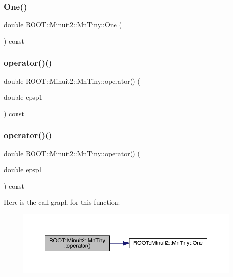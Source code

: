 \subsubsection{\texorpdfstring{One()}{One()}\hspace{0.1cm}{\footnotesize\ttfamily [2/2]}}
{\footnotesize\ttfamily double R\+O\+O\+T\+::\+Minuit2\+::\+Mn\+Tiny\+::\+One (\begin{DoxyParamCaption}{ }\end{DoxyParamCaption}) const}

\mbox{\label{classROOT_1_1Minuit2_1_1MnTiny_ae266eaf0c58687bf37419ca463c51bf7}} 
\subsubsection{\texorpdfstring{operator()()}{operator()()}\hspace{0.1cm}{\footnotesize\ttfamily [1/2]}}
{\footnotesize\ttfamily double R\+O\+O\+T\+::\+Minuit2\+::\+Mn\+Tiny\+::operator() (\begin{DoxyParamCaption}\item[{double}]{epsp1 }\end{DoxyParamCaption}) const}

\mbox{\label{classROOT_1_1Minuit2_1_1MnTiny_ae266eaf0c58687bf37419ca463c51bf7}} 
\subsubsection{\texorpdfstring{operator()()}{operator()()}\hspace{0.1cm}{\footnotesize\ttfamily [2/2]}}
{\footnotesize\ttfamily double R\+O\+O\+T\+::\+Minuit2\+::\+Mn\+Tiny\+::operator() (\begin{DoxyParamCaption}\item[{double}]{epsp1 }\end{DoxyParamCaption}) const}

Here is the call graph for this function\+:\nopagebreak
\begin{figure}[H]
\begin{center}
\leavevmode
\includegraphics[width=350pt]{d6/d77/classROOT_1_1Minuit2_1_1MnTiny_ae266eaf0c58687bf37419ca463c51bf7_cgraph}
\end{center}
\end{figure}



